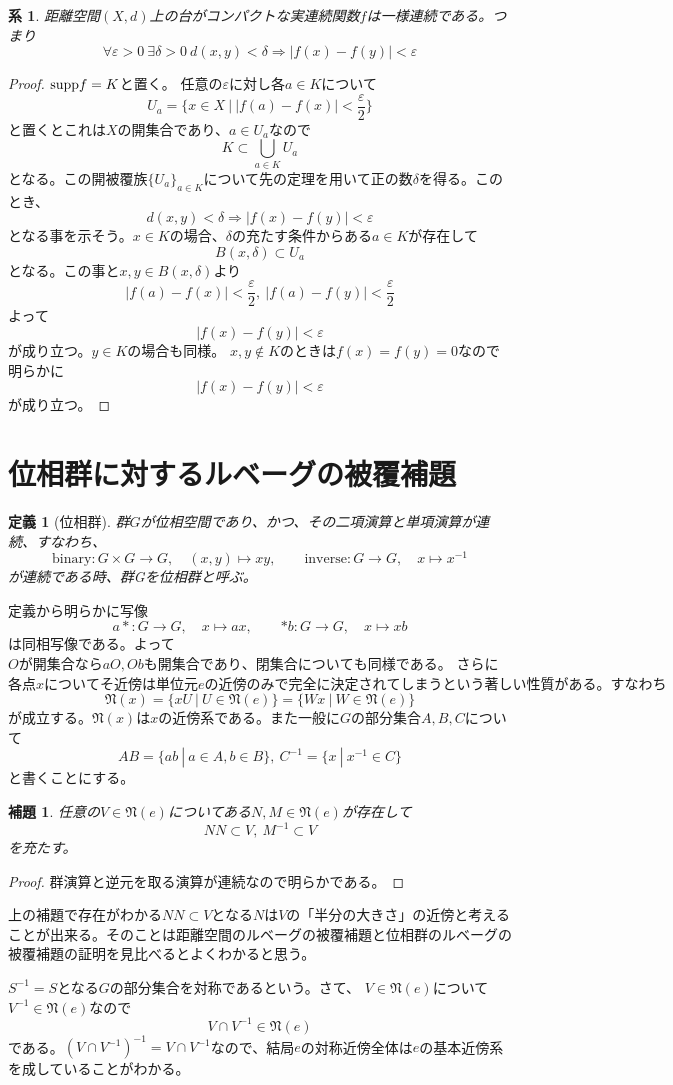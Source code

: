 \documentclass[leqno]{jsarticle}
\newtheorem{cor}[thm]{系}
\newtheorem{lem}[thm]{補題}
\newtheorem{df}[thm]{定義}
\newcommand{\To}{\Longrightarrow}
\newcommand{\ep}{\varepsilon}
\newcommand{\supp}{\text{{\rm supp}}}
\begin{document}
\begin{cor}
距離空間$(X,d)$上の台がコンパクトな実連続関数$f$は一様連続である。つまり
\[
\forall \ep >0\ \exists \delta >0\ d(x,y)<\delta \To |f(x)-f(y)|<\ep
\]
\end{cor}
\begin{proof}
$\supp f=K$と置く。
任意の$\ep$に対し各$a\in K$について
\[
U_a=\{x\in X\ |\ |f(a)-f(x)|<\frac{\ep}{2}\}
\]
と置くとこれは$X$の開集合であり、$a\in U_a$なので
\[
K\subset \bigcup_{a\in K}U_a
\]
となる。この開被覆族$\{U_a\}_{a\in K}$について先の定理を用いて正の数$\delta$を得る。このとき、
\[
d(x,y)<\delta \To |f(x)-f(y)|<\ep
\]
となる事を示そう。$x\in K$の場合、$\delta$の充たす条件からある$a\in K$が存在して
\[
B(x,\delta)\subset U_a
\]
となる。この事と$x,y\in B(x,\delta)$より
\[
|f(a)-f(x)|<\frac{\ep}{2},\ |f(a)-f(y)|<\frac{\ep}{2}
\]よって
\[
|f(x)-f(y)|<\ep
\]
が成り立つ。$y\in K$の場合も同様。
$x,y\not\in K$のときは$f(x)=f(y)=0$なので明らかに
\[
|f(x)-f(y)|<\ep
\]が成り立つ。
\end{proof}

\section{位相群に対するルベーグの被覆補題}

\begin{df}[位相群]
群$G$が位相空間であり、かつ、その二項演算と単項演算が連続、すなわち、
\[
\mathrm{binary}\colon G\times G\rightarrow G,\quad (x,y)\mapsto xy,\qquad \mathrm{inverse}\colon G\rightarrow G,\quad x\mapsto x^{-1}
\]が連続である時、群Gを位相群と呼ぶ。
\end{df}
定義から明らかに写像
\[
\mathord{a\ast}\colon G\rightarrow G,\quad x\mapsto ax,\qquad \mathord{\ast b}\colon G\rightarrow G,\quad x \mapsto xb
\]は同相写像である。よって$Oが開集合ならaO,Obも開集合であり、閉集合についても同様である。$
さらに$各点xについてそ近傍は単位元eの近傍のみで完全に決定されてしまうという著しい性質がある。すなわち$
\[
\mathfrak{N}(x)=\{xU\ |\ U\in \mathfrak{N}(e)\}=\{Wx\ |\ W\in \mathfrak{N}(e)\}
\]が成立する。$\mathfrak{N}(x)$は$x$の近傍系である。また一般に$G$の部分集合$A,B,C$について
\[
AB=\{ab\ |\ a\in A,b\in B\},\ C^{-1}=\{x\ |\ x^{-1}\in C\}
\]
と書くことにする。

\begin{lem}
任意の$V\in \mathfrak{N}(e)$についてある$N,M\in \mathfrak{N}(e)$が存在して
\[
NN\subset V,\ M^{-1}\subset V
\]
を充たす。
\end{lem}
\begin{proof}
群演算と逆元を取る演算が連続なので明らかである。
\end{proof}
上の補題で存在がわかる$NN\subset V$となる$N$は$V$の「半分の大きさ」の近傍と考えることが出来る。そのことは距離空間のルベーグの被覆補題と位相群のルベーグの被覆補題の証明を見比べるとよくわかると思う。\par
$S^{-1}=S$となる$G$の部分集合を対称であるという。さて、
$V\in \mathfrak{N}(e)$について$V^{-1}\in \mathfrak{N}(e)$なので
\[
V\cap V^{-1}\in \mathfrak{N}(e)
\]
である。$(V\cap V^{-1})^{-1}=V\cap V^{-1}$なので、結局$e$の対称近傍全体は$e$の基本近傍系を成していることがわかる。
\end{document}

